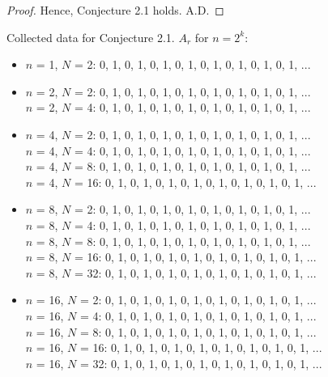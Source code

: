 \documentclass{article}
\begin{document}
\begin{flushleft}
\begin{proof}
        \vspace{.1in}

        Hence, Conjecture 2.1 holds. \hspace{2.4in} A.D.
    \end{proof}

    \vspace{.1in}
    
    Collected data for Conjecture 2.1. $A_r$ for $n=2^k$:
    \begin{itemize}
        \item $n$ = 1, $N$ = 2:  0, 1, 0, 1, 0, 1, 0, 1, 0, 1, 0, 1, 0, 1, 0, 1, ...
        \item $n$ = 2, $N$ = 2:  0, 1, 0, 1, 0, 1, 0, 1, 0, 1, 0, 1, 0, 1, 0, 1, ...
            \\ $n$ = 2, $N$ = 4:  0, 1, 0, 1, 0, 1, 0, 1, 0, 1, 0, 1, 0, 1, 0, 1, ...
        \item $n$ = 4, $N$ = 2:  0, 1, 0, 1, 0, 1, 0, 1, 0, 1, 0, 1, 0, 1, 0, 1, ...
            \\ $n$ = 4, $N$ = 4:  0, 1, 0, 1, 0, 1, 0, 1, 0, 1, 0, 1, 0, 1, 0, 1, ...
            \\ $n$ = 4, $N$ = 8:  0, 1, 0, 1, 0, 1, 0, 1, 0, 1, 0, 1, 0, 1, 0, 1, ...
            \\ $n$ = 4, $N$ = 16:  0, 1, 0, 1, 0, 1, 0, 1, 0, 1, 0, 1, 0, 1, 0, 1, ...
        \item $n$ = 8, $N$ = 2:  0, 1, 0, 1, 0, 1, 0, 1, 0, 1, 0, 1, 0, 1, 0, 1, ...
            \\ $n$ = 8, $N$ = 4:  0, 1, 0, 1, 0, 1, 0, 1, 0, 1, 0, 1, 0, 1, 0, 1, ...
            \\ $n$ = 8, $N$ = 8:  0, 1, 0, 1, 0, 1, 0, 1, 0, 1, 0, 1, 0, 1, 0, 1, ...
            \\ $n$ = 8, $N$ = 16:  0, 1, 0, 1, 0, 1, 0, 1, 0, 1, 0, 1, 0, 1, 0, 1, ...
            \\ $n$ = 8, $N$ = 32:  0, 1, 0, 1, 0, 1, 0, 1, 0, 1, 0, 1, 0, 1, 0, 1, ...
        \item $n$ = 16, $N$ = 2:  0, 1, 0, 1, 0, 1, 0, 1, 0, 1, 0, 1, 0, 1, 0, 1, ...
            \\ $n$ = 16, $N$ = 4:  0, 1, 0, 1, 0, 1, 0, 1, 0, 1, 0, 1, 0, 1, 0, 1, ...
            \\ $n$ = 16, $N$ = 8:  0, 1, 0, 1, 0, 1, 0, 1, 0, 1, 0, 1, 0, 1, 0, 1, ...
            \\ $n$ = 16, $N$ = 16:  0, 1, 0, 1, 0, 1, 0, 1, 0, 1, 0, 1, 0, 1, 0, 1, ...
            \\ $n$ = 16, $N$ = 32:  0, 1, 0, 1, 0, 1, 0, 1, 0, 1, 0, 1, 0, 1, 0, 1, ...

\end{itemize}
\end{flushleft}
\end{document}
